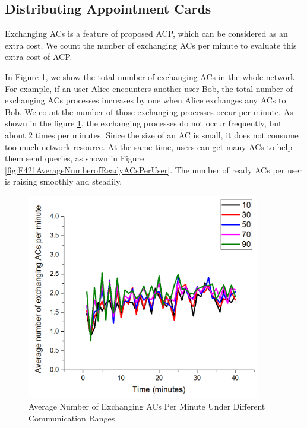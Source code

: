 \subsection{ Distributing Appointment Cards}

\noindent Exchanging ACs is a feature of proposed ACP, which can be considered as an extra cost. We count the number of exchanging ACs per minute to evaluate this extra cost of ACP.

In Figure \ref{fig:F422AverageNumberofExchangingACsPerMinute}, we show the total number of exchanging ACs in the whole network. For example, if an user Alice encounters another user Bob, the total number of exchanging ACs processes increases by one when Alice exchanges any ACs to Bob. We count the number of those exchanging processes occur per minute. As shown in the figure \ref{fig:F422AverageNumberofExchangingACsPerMinute}, the exchanging processes do not occur frequently, but about 2 times per minutes. Since the size of an AC is small, it does not consume too much network resource. At the same time, users can get many ACs to help them send queries, as shown in Figure \ref{fig:F421AverageNumberofReadyACsPerUser}. The number of ready ACs per user is raising smoothly and steadily. 

\begin{figure} [hbtp]
\centering 
\includegraphics[width=4.0in]{figures/F422AverageNumberofExchangingACsPerMinute.png}
\caption{Average Number of Exchanging ACs Per Minute Under Different Communication Ranges} 
\label{fig:F422AverageNumberofExchangingACsPerMinute} %
\end{figure}

